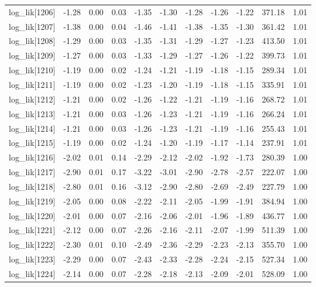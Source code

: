 \begin{table}[ht]
\begin{tabular}{rrrrrrrrrrr}
  log\_lik[1206] & -1.28 & 0.00 & 0.03 & -1.35 & -1.30 & -1.28 & -1.26 & -1.22 & 371.18 & 1.01 \\ 
  log\_lik[1207] & -1.38 & 0.00 & 0.04 & -1.46 & -1.41 & -1.38 & -1.35 & -1.30 & 361.42 & 1.01 \\ 
  log\_lik[1208] & -1.29 & 0.00 & 0.03 & -1.35 & -1.31 & -1.29 & -1.27 & -1.23 & 413.50 & 1.01 \\ 
  log\_lik[1209] & -1.27 & 0.00 & 0.03 & -1.33 & -1.29 & -1.27 & -1.26 & -1.22 & 399.73 & 1.01 \\ 
  log\_lik[1210] & -1.19 & 0.00 & 0.02 & -1.24 & -1.21 & -1.19 & -1.18 & -1.15 & 289.34 & 1.01 \\ 
  log\_lik[1211] & -1.19 & 0.00 & 0.02 & -1.23 & -1.20 & -1.19 & -1.18 & -1.15 & 335.91 & 1.01 \\ 
  log\_lik[1212] & -1.21 & 0.00 & 0.02 & -1.26 & -1.22 & -1.21 & -1.19 & -1.16 & 268.72 & 1.01 \\ 
  log\_lik[1213] & -1.21 & 0.00 & 0.03 & -1.26 & -1.23 & -1.21 & -1.19 & -1.16 & 266.24 & 1.01 \\ 
  log\_lik[1214] & -1.21 & 0.00 & 0.03 & -1.26 & -1.23 & -1.21 & -1.19 & -1.16 & 255.43 & 1.01 \\ 
  log\_lik[1215] & -1.19 & 0.00 & 0.02 & -1.24 & -1.20 & -1.19 & -1.17 & -1.14 & 237.91 & 1.01 \\ 
  log\_lik[1216] & -2.02 & 0.01 & 0.14 & -2.29 & -2.12 & -2.02 & -1.92 & -1.73 & 280.39 & 1.00 \\ 
  log\_lik[1217] & -2.90 & 0.01 & 0.17 & -3.22 & -3.01 & -2.90 & -2.78 & -2.57 & 222.07 & 1.00 \\ 
  log\_lik[1218] & -2.80 & 0.01 & 0.16 & -3.12 & -2.90 & -2.80 & -2.69 & -2.49 & 227.79 & 1.00 \\ 
  log\_lik[1219] & -2.05 & 0.00 & 0.08 & -2.22 & -2.11 & -2.05 & -1.99 & -1.91 & 384.94 & 1.00 \\ 
  log\_lik[1220] & -2.01 & 0.00 & 0.07 & -2.16 & -2.06 & -2.01 & -1.96 & -1.89 & 436.77 & 1.00 \\ 
  log\_lik[1221] & -2.12 & 0.00 & 0.07 & -2.26 & -2.16 & -2.11 & -2.07 & -1.99 & 511.39 & 1.00 \\ 
  log\_lik[1222] & -2.30 & 0.01 & 0.10 & -2.49 & -2.36 & -2.29 & -2.23 & -2.13 & 355.70 & 1.00 \\ 
  log\_lik[1223] & -2.29 & 0.00 & 0.07 & -2.43 & -2.33 & -2.28 & -2.24 & -2.15 & 527.34 & 1.00 \\ 
  log\_lik[1224] & -2.14 & 0.00 & 0.07 & -2.28 & -2.18 & -2.13 & -2.09 & -2.01 & 528.09 & 1.00 \\ 

\end{tabular}
\end{table}
